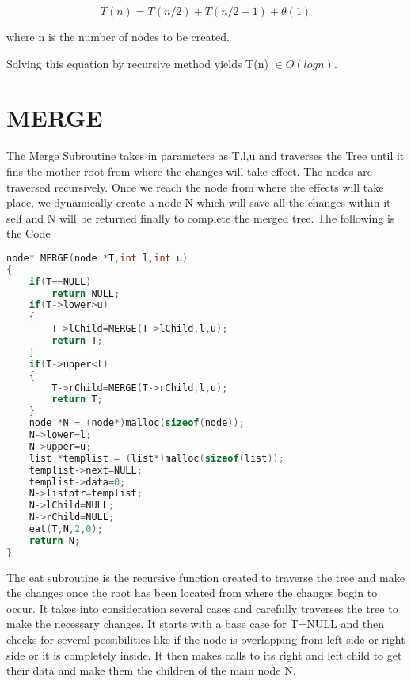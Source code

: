 \documentclass{article}
\begin{document}
\[ T(n) = T(n/2) + T(n/2-1) + \theta(1) \]

where n is the number of nodes to be created.

Solving this equation by recursive method yields T(n) $\in O(log n)$.

\section{MERGE}

The Merge Subroutine takes in parameters as T,l,u and traverses the Tree until it fins the mother root from where the changes will take effect. The nodes are traversed recursively. Once we reach the node from where the effects will take place, we dynamically create a node N which will save all the changes within it self and N will be returned finally to complete the merged tree.
The following is the Code
\begin{lstlisting}[language=c, caption=elimin\_solve]
node* MERGE(node *T,int l,int u)
{
    if(T==NULL)
        return NULL;
    if(T->lower>u)
    {
        T->lChild=MERGE(T->lChild,l,u);
        return T;
    }
    if(T->upper<l)
    {
        T->rChild=MERGE(T->rChild,l,u);
        return T;
    }
    node *N = (node*)malloc(sizeof(node));
    N->lower=l;
    N->upper=u;
    list *templist = (list*)malloc(sizeof(list));
    templist->next=NULL;
    templist->data=0;
    N->listptr=templist;
    N->lChild=NULL;
    N->rChild=NULL;
    eat(T,N,2,0);
    return N;
}
\end{lstlisting}

The eat subroutine is the recursive function created to traverse the tree and make the changes once the root has been located from where the changes begin to occur.
It takes into consideration several cases and carefully traverses the tree to make the necessary changes.
It starts with a base case for T=NULL and then checks for several possibilities like if the node is overlapping from left side or right side or it is completely inside. It then makes calls to its right and left child to get their data and make them the children of the main node N.
\end{document}
